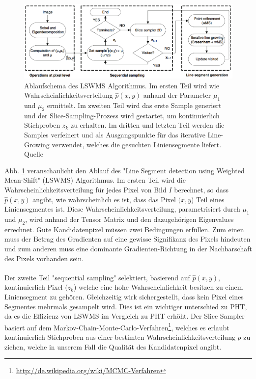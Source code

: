 \begin{figure}[!ht]
\centering
\includegraphics[width=\textwidth]{images/lswms} 
\caption{Ablaufschema des LSWMS Algorithmus. Im ersten Teil wird wie Wahrscheinlichkeitsverteilung $\hat{p}(x,y)$ anhand der Parameter $\mu_1$ und $\mu_2$ ermittelt. Im zweiten Teil wird das erste Sample generiert und der Slice-Sampling-Prozess wird gestartet, um kontinuierlich Stichproben $z_k$ zu erhalten. Im dritten und letzten Teil werden die Samples verfeinert und als Ausgangspunkte für das iterative Line-Growing verwendet, welches die gesuchten Liniensegmente liefert. Quelle \cite{nieto}}
\label{fig:lswms}
\end{figure}
\noindent
Abb. \ref{fig:lswms} veranschaulicht den Ablauf des "Line Segment detection using Weighted Mean-Shift" (LSWMS) Algorithmus. Im ersten Teil wird die Wahrscheinlichkeitsverteilung für jedes Pixel von Bild $I$ berechnet, so dass $\hat{p}(x, y)$ angibt, wie wahrscheinlich es ist, dass das Pixel $(x, y$) Teil eines Liniensegmentes ist. Diese Wahrscheinlichkeitsverteilung, parametrisiert durch $\mu_1$ und $\mu_2$, wird anhand der Tensor Matrix und den dazugehörigen Eigenvalues errechnet. Gute Kandidatenpixel müssen zwei Bedingungen erfüllen. Zum einen muss der Betrag des Gradienten auf eine gewisse Signifikanz des Pixels hindeuten und zum anderen muss eine dominante Gradienten-Richtung in der Nachbarschaft des Pixels vorhanden sein.
\paragraph{}
Der zweite Teil "sequential sampling" selektiert, basierend auf $\hat{p}(x,y)$, kontinuierlich Pixel ($z_k$) welche eine hohe Wahrscheinlichkeit besitzen zu einem Liniensegment zu gehören. Gleichzeitig wirk sichergestellt, dass kein Pixel eines Segmentes mehrmals gesampelt wird. Dies ist ein wichtiger unterschied zu PHT, da es die Effizienz von LSWMS im Vergleich zu PHT erhöht. Der Slice Sampler basiert auf dem Markov-Chain-Monte-Carlo-Verfahren\footnote{\protect\url{http://de.wikipedia.org/wiki/MCMC-Verfahren}}, welches es erlaubt kontinuierlich Stichproben aus einer bestimten Wahrscheinlichkeitsverteilung $p$ zu ziehen, welche in unserem Fall die Qualität des Kandidatenpixel angibt.
